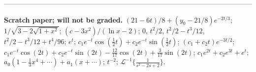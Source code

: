 \documentclass[12pt]{amsart}
\begin{document}
\noindent
------------------------------------------------------------------------------------------------------------

\noindent
{\bf Scratch paper; will not be graded.}
$(21-6t)/8+(y_0-21/8)e^{-2t/3}$;
$1/ \sqrt{3-2 \sqrt{1+x^2}}$;
$(c-3x^2)/(\ln x -2)$; 
$0$, $t^2/2$, $t^2/2-t^3/12$, $t^2/2-t^3/12+t^4/96$;
$e^t$;
$c_1e^{-t}\cos(\frac{1}{2}t)+c_2e^{-t} \sin( \frac{1}{2}t)$;
$(c_1+c_2t)e^{-3t/2}$;
$c_1e^{-t} \cos (2t)+c_2 e^{-t} \sin (2t) - \frac{12}{17} \cos (2t) + \frac{3}{17}\sin(2t)$;
$c_1e^{2t}+c_2e^{3t}+e^t$;
$a_0( 1-\frac{1}{3}x^4+ \cdots) +a_1( x+ \cdots)$;
$t^{-2}$; ${\mathcal L}^{-1}\{ \frac{1}{s^2-2s+2} \}$.
\end{document}
